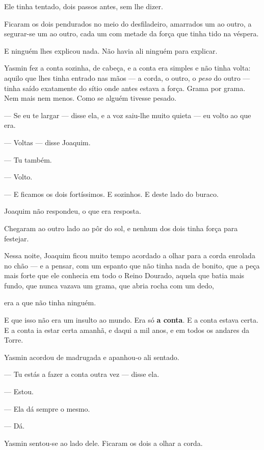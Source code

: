 \documentclass[livro.tex]{subfiles}
\begin{document}
Ele tinha tentado, dois passos antes, sem lhe dizer.

\medskip

Ficaram os dois pendurados no meio do desfiladeiro, amarrados um ao outro, a segurar-se um ao outro, cada um com
metade da força que tinha tido na véspera.

E ninguém lhes explicou nada. Não havia ali ninguém para explicar.

Yasmin fez a conta sozinha, de cabeça, e a conta era simples e não tinha volta: aquilo que lhes tinha entrado nas
mãos --- a corda, o outro, o \emph{peso} do outro --- tinha saído exatamente do sítio onde antes estava a força.
Grama por grama. Nem mais nem menos. Como se alguém tivesse pesado.

--- Se eu te largar --- disse ela, e a voz saiu-lhe muito quieta --- eu volto ao que era.

--- Voltas --- disse Joaquim.

--- Tu também.

--- Volto.

--- E ficamos os dois fortíssimos. E sozinhos. E deste lado do buraco.

Joaquim não respondeu, o que era resposta.

\medskip

Chegaram ao outro lado ao pôr do sol, e nenhum dos dois tinha força para festejar.

Nessa noite, Joaquim ficou muito tempo acordado a olhar para a corda enrolada no chão --- e a pensar, com um
espanto que não tinha nada de bonito, que a peça mais forte que ele conhecia em todo o Reino Dourado, aquela que
batia mais fundo, que nunca vazava um grama, que abria rocha com um dedo,

era a que não tinha ninguém.

E que isso não era um insulto ao mundo. Era só \textbf{a conta}. E a conta estava certa. E a conta ia estar certa
amanhã, e daqui a mil anos, e em todos os andares da Torre.

\medskip

Yasmin acordou de madrugada e apanhou-o ali sentado.

--- Tu estás a fazer a conta outra vez --- disse ela.

--- Estou.

--- Ela dá sempre o mesmo.

--- Dá.

Yasmin sentou-se ao lado dele. Ficaram os dois a olhar a corda.
\end{document}
